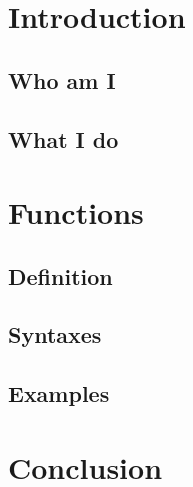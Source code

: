 \documentclass{article}
\begin{document}
\section{Introduction}
\subsection{Who am I}
\Blindtext[6]
\subsection{What I do}
\Blindtext[6]



\section{Functions}
\subsection{Definition}
\Blindtext[5]
\subsection{Syntaxes}
\Blindtext[2]
\subsection{Examples}
\Blindtext[17]



\section{Conclusion}
\Blindtext[3]
\end{document}
